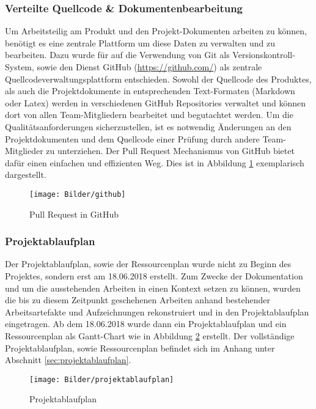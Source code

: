 \subsubsection{Verteilte Quellcode \& Dokumentenbearbeitung}
Um Arbeitsteilig am Produkt und den Projekt-Dokumenten arbeiten zu können, benötigt es eine zentrale Plattform um diese Daten zu verwalten und zu bearbeiten. Dazu wurde für auf die Verwendung von Git als Versionskontroll-System, sowie den Dienst GitHub (\href{https://github.com/}{https://github.com/}) als zentrale Quellcodeverwaltungsplattform entschieden. Sowohl der Quellcode des Produktes, als auch die Projektdokumente in entsprechenden Text-Formaten (Markdown oder Latex) werden in verschiedenen GitHub Repositories verwaltet und können dort von allen Team-Mitgliedern bearbeitet und begutachtet werden. Um die Qualitätsanforderungen sicherzustellen, ist es notwendig Änderungen an den Projektdokumenten und dem Quellcode einer Prüfung durch andere Team-Mitglieder zu unterziehen. Der Pull Request Mechanismus von GitHub bietet dafür einen einfachen und effizienten Weg. Dies ist in Abbildung \ref{fig:github} exemplarisch dargestellt.

\begin{figure}[H]
	\texttt{[image: Bilder/github]}
	\caption{Pull Request in GitHub}
	\label{fig:github}
\end{figure}

\subsubsection{Projektablaufplan}
Der Projektablaufplan, sowie der Ressourcenplan wurde nicht zu Beginn des Projektes, sondern erst am 18.06.2018 erstellt. Zum Zwecke der Dokumentation und um die ausstehenden Arbeiten in einen Kontext setzen zu können, wurden die bis zu diesem Zeitpunkt geschehenen Arbeiten anhand bestehender Arbeitsartefakte und Aufzeichnungen rekonstruiert und in den Projektablaufplan eingetragen. Ab dem 18.06.2018 wurde dann ein Projektablaufplan und ein Ressourcenplan als Gantt-Chart wie in Abbildung \ref{fig:projektablaufplan} erstellt. Der vollständige Projektablaufplan, sowie Ressourcenplan befindet sich im Anhang unter Abschnitt \ref{sec:projektablaufplan}.
\begin{figure}[H]
	\texttt{[image: Bilder/projektablaufplan]}
	\caption{Projektablaufplan}
	\label{fig:projektablaufplan}
\end{figure}
